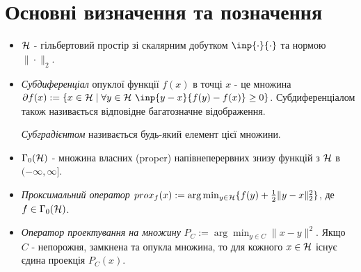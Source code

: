 \documentclass[main.tex]{subfile}
\begin{document}
	\appendix
	\section{Основні визначення та позначення}
    \begin{itemize}
    	\item $\mathcal{H}$ - гільбертовий простір зі скалярним добутком  $\inp{\cdot}{\cdot}$ та нормою $\|\cdot\|_2$.
    	\item {\itshape Субдиференціал} опуклої функції $f(x)$ в точці $x$ - це множина \newline $\partial f(x) := \{x \in \Hil \mid  \forall y \in \Hil \ \inp{y-x}{f(y)-f(x)} \geq 0\}$. Субдиференціалом також називається відповідне багатозначне відображення. 
    	
    	{\itshape Субградієнтом} називається будь-який елемент цієї множини.
    	
    	\item $\Gamma_0(\mathcal{H})$ - множина власних (proper) напівнеперервних знизу функцій з $\mathcal{H}$ в $(-\infty, \infty]$.
    	
    	\item {\itshape Проксимальний оператор} $prox_f(x) := \arg \min_{y \in \mathcal{H}} \{f(y) + \frac{1}{2}\|y-x\|_2^2\}$, де $f \in \Gamma_0(\mathcal{H})$. 
    	
    	\item {\itshape Оператор проектування на множину } $P_C := \arg \min_{y \in C} \|x - y\|^2$. Якщо $C$ - непорожня, замкнена та опукла множина, то для кожного $x \in \mathcal{H}$ існує єдина проекція $P_C(x)$. 
    \end{itemize}
\end{document}
